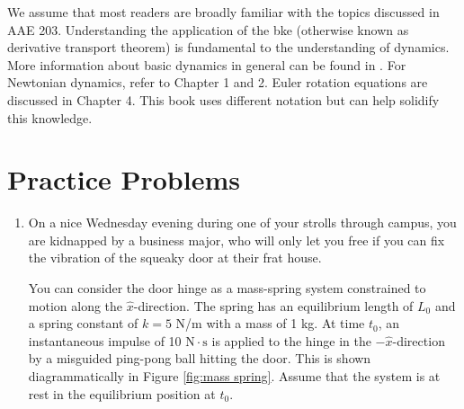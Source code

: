\documentclass[12pt]{report}
\begin{document}
We assume that most readers are broadly familiar with the topics discussed in AAE 203. Understanding the application of the \gls{bke} (otherwise known as derivative transport theorem) is fundamental to the understanding of dynamics. More information about basic dynamics in general can be found in \cite{kasdin_engineering_2011}. For Newtonian dynamics, refer to Chapter 1 and 2. Euler rotation equations are discussed in Chapter 4. This book uses different notation but can help solidify this knowledge.

\section{Practice Problems}
\begin{enumerate}
    \item On a nice Wednesday evening during one of your strolls through campus, you are kidnapped by a business major, who will only let you free if you can fix the vibration of the squeaky door at their frat house.

You can consider the door hinge as a mass-spring system constrained to motion along the $\hat{x}$-direction. The spring has an equilibrium length of $L_0$ and a spring constant of $k=5$ N/m with a mass of 1 kg. At time $t_0$, an instantaneous impulse of 10 $\mathrm{N}\cdot \mathrm{s}$ is applied to the hinge in the $-\hat{x}$-direction by a misguided ping-pong ball hitting the door. This is shown diagrammatically in Figure \ref{fig:mass spring}. Assume that the system is at rest in the equilibrium position at $t_0$.
\begin{figure}[ht]
    \centering
    



\begin{tikzpicture}[x=0.75pt,y=0.75pt,yscale=-1,xscale=1]


\end{tikzpicture}
\end{figure}
\end{enumerate}
\end{document}
